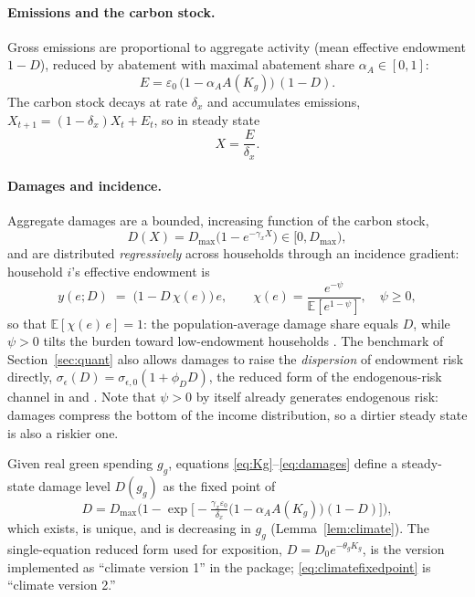 \documentclass[12pt]{article}
\newcommand{\E}{\mathbb{E}}
\begin{document}
\paragraph{Emissions and the carbon stock.} Gross emissions are proportional
to aggregate activity (mean effective endowment $1-D$), reduced by abatement
with maximal abatement share $\alpha_A\in[0,1]$:
\begin{equation}
E = \varepsilon_0\,\big(1-\alpha_A A(K_g)\big)\,(1-D).
\label{eq:emissions}
\end{equation}
The carbon stock decays at rate $\delta_x$ and accumulates emissions,
$X_{t+1} = (1-\delta_x)X_t + E_t$, so in steady state
\begin{equation}
X = \frac{E}{\delta_x}.
\label{eq:carbon}
\end{equation}

\paragraph{Damages and incidence.} Aggregate damages are a bounded, increasing
function of the carbon stock,
\begin{equation}
D(X) = D_{\max}\big(1-e^{-\gamma_x X}\big)\in[0,D_{\max}),
\label{eq:damages}
\end{equation}
and are distributed \emph{regressively} across households through an incidence
gradient: household $i$'s effective endowment is
\begin{equation}
y(e;D) \;=\; \big(1 - D\,\chi(e)\big)\,e, \qquad
\chi(e) = \frac{e^{-\psi}}{\E\!\left[e^{1-\psi}\right]},\quad \psi\ge0,
\label{eq:incidence}
\end{equation}
so that $\E[\chi(e)\,e]=1$: the population-average damage share equals $D$,
while $\psi>0$ tilts the burden toward low-endowment households
\citep[the incidence evidence in][]{kanzig2023carbon,fried2018}. The
benchmark of Section~\ref{sec:quant} also allows damages to raise the
\emph{dispersion} of endowment risk directly,
$\sigma_\epsilon(D)=\sigma_{\epsilon,0}(1+\phi_D D)$, the reduced form of the
endogenous-risk channel in \citet{acharya2023optimal} and
\citet{acharyabenhabib2024}. Note that $\psi>0$ by itself already generates
endogenous risk: damages compress the bottom of the income distribution, so a
dirtier steady state is also a riskier one.

Given real green spending $g_g$, equations
\eqref{eq:Kg}--\eqref{eq:damages} define a steady-state damage level
$D(g_g)$ as the fixed point of
\begin{equation}
D = D_{\max}\Big(1 - \exp\Big[-\tfrac{\gamma_x \varepsilon_0}{\delta_x}
\big(1-\alpha_A A(K_g)\big)(1-D)\Big]\Big),
\label{eq:climatefixedpoint}
\end{equation}
which exists, is unique, and is decreasing in $g_g$
(Lemma~\ref{lem:climate}). The single-equation reduced form used for
exposition, $D = D_0 e^{-\theta_g K_g}$, is the version implemented as
``climate version 1'' in the package; \eqref{eq:climatefixedpoint} is
``climate version 2.''
\end{document}
